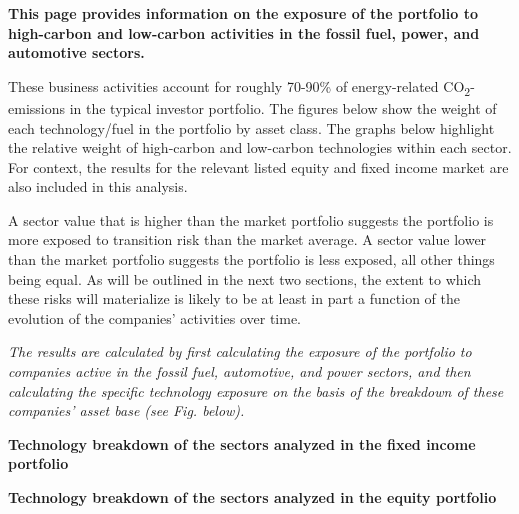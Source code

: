 \documentclass[10pt,table,a4]{article}\usepackage[]{graphicx}\usepackage[]{color}
\begin{document}
	\begin{multicols}{2}
		
		
		\textbf{This page provides information on the exposure of the portfolio to high-carbon and low-carbon activities in the fossil fuel, power, and automotive sectors. }
		
		These business activities account for roughly 70-90\% of energy-related CO\textsubscript{2}-emissions in the typical investor portfolio. The figures below show the weight of each technology/fuel in the portfolio by asset class. The graphs below highlight the relative weight of high-carbon and low-carbon technologies within each sector. For context, the results for the relevant listed equity and fixed income market are also included in this analysis.
		
		A sector value that is higher than the market portfolio suggests the portfolio is more exposed to transition risk than the market average. A sector value lower than the market portfolio suggests the portfolio is less exposed, all other things being equal. As will be outlined in the next two sections, the extent to which these risks will materialize is likely to be at least in part a function of the evolution of the companies’ activities over time. 
		
		\textit{The results are calculated by first calculating the exposure of the portfolio to companies active in the fossil fuel, automotive, and power sectors, and then calculating the specific technology exposure on the basis of the breakdown of these companies’ asset base (see Fig. below). }
		
		\vspace{-0.1cm}
		
	\end{multicols}
	
	\vspace{-1.2cm}
	
	\textbf{Technology breakdown of the sectors analyzed in the fixed income portfolio} %
	
	\vspace{-0.2cm}
	
	
	
	\textbf{Technology breakdown of the sectors analyzed in the equity portfolio} %
	
	\vspace{-0.2cm}
	
\end{document}
